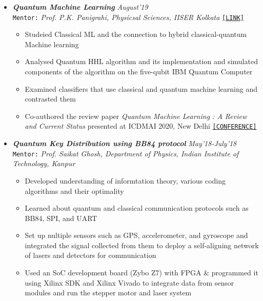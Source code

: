 \documentclass[11pt,a4paper]{article}
\begin{document}
\begin{itemize}
\fi

    \item \textbf{\textit{Quantum Machine Learning}} \hfill \textit{August'19}\\
    \texttt{Mentor:} \textit{Prof. P.K. Panigrahi, Physicsal Sciences, IISER Kolkata}  \hfill \href{https://link.springer.com/chapter/10.1007/978-981-15-5619-7_8}{\texttt{[LINK]}}
    \begin{itemize}
        \item Studeied Classical ML and the connection to hybrid classical-quantum Machine learning
        \item Analysed Quantum HHL algorithm and its implementation and simulated components of the algorithm on the five-qubit IBM Quantum Computer
        \item Examined classifiers that use classical and quantum machine learning and contrasted them
        \item Co-authored the review paper \textit{Quantum Machine Learning : A Review and Current Status} presented at ICDMAI 2020, New Delhi  \hfill \href{https://www.icdmai.org/}{\texttt{[CONFERENCE]}}
    \end{itemize}
    \item \textbf{\textit{Quantum Key Distribution using BB84 protocol}} \hfill \textit{May'18-July'18}\\
    \texttt{Mentor:} \textit{Prof. Saikat Ghosh, Department of Physics, Indian Institute of Technology, Kanpur} \hfill
    \begin{itemize}
        \item Developed understanding of informtation theory, various coding algorithms and their optimality
        \item Learned about quantum and classical communication protocols such as BB84, SPI, and UART
        \item Set up nultiple sensors such as GPS, accelerometer, and gyroscope and integrated the signal collected from them to deploy a self-aligning network of lasers and detectors for communication
        \item Used an SoC development board (Zybo Z7) with FPGA \& programmed it using Xilinx SDK and Xilinx Vivado to integrate data from sensor modules and run the stepper motor and laser system

\end{itemize}
\end{itemize}
\end{document}
